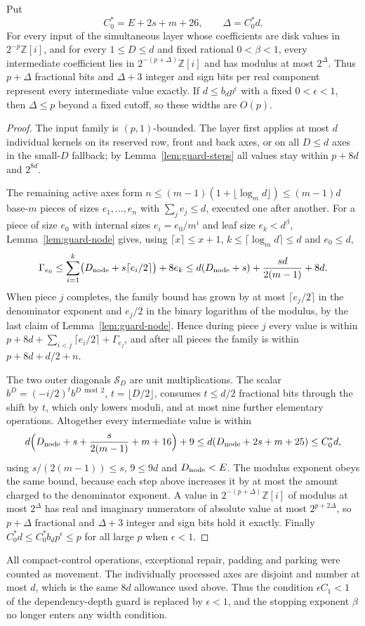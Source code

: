 \begin{proposition}\label{prop:linear-guard}
Put
\[
 C_0^*=E+2s+m+26,\qquad \Delta=C_0^*d .
\]
For every input of the simultaneous layer whose coefficients are disk values
in $2^{-p}\mathbb Z[i]$, and for every $1\le D\le d$ and fixed rational
$0<\beta<1$, every intermediate coefficient lies in
$2^{-(p+\Delta)}\mathbb Z[i]$ and has modulus at most $2^\Delta$. Thus $p+\Delta$
fractional bits and $\Delta+3$ integer and sign bits per real component
represent every intermediate value exactly. If $d\le b_dp^\epsilon$ with a
fixed $0<\epsilon<1$, then $\Delta\le p$ beyond a fixed cutoff, so these
widths are $O(p)$.
\end{proposition}
\begin{proof}
The input family is $(p,1)$-bounded. The layer first applies at most $d$
individual kernels on its reserved row, front and back axes, or on all $D\le d$
axes in the small-$D$ fallback; by Lemma~\ref{lem:guard-steps} all values stay
within $p+8d$ and $2^{8d}$.

The remaining active axes form $n\le(m-1)(1+\lfloor\log_md\rfloor)\le(m-1)d$
base-$m$ pieces of sizes $e_1,\ldots,e_n$ with $\sum_je_j\le d$, executed one
after another. For a piece of size $e_0$ with internal sizes
$e_i=e_0/m^i$ and leaf size $e_k<d^\beta$, Lemma~\ref{lem:guard-node} gives,
using $\lceil x\rceil\le x+1$, $k\le\lceil\log_md\rceil\le d$ and $e_0\le d$,
\[
 \Gamma_{e_0}\le\sum_{i=1}^k\bigl(D_{\rm node}+s\lceil e_i/2\rceil\bigr)+8e_k
 \le d(D_{\rm node}+s)+\frac{sd}{2(m-1)}+8d .
\]
When piece $j$ completes, the family bound has grown by at most
$\lceil e_j/2\rceil$ in the denominator exponent and $e_j/2$ in the binary
logarithm of the modulus, by the last claim of Lemma~\ref{lem:guard-node}. Hence during piece $j$ every value is within
$p+8d+\sum_{i<j}\lceil e_i/2\rceil+\Gamma_{e_j}$, and after all pieces the
family is within $p+8d+d/2+n$.

The two outer diagonals $\mathcal S_D$ are unit multiplications. The scalar
$b^D=(-i/2)^tb^{D\bmod2}$, $t=\lfloor D/2\rfloor$, consumes $t\le d/2$
fractional bits through the shift by $t$, which only lowers moduli, and at most
nine further elementary operations. Altogether every intermediate value is
within
\[
 d\Bigl(D_{\rm node}+s+\frac{s}{2(m-1)}+m+16\Bigr)+9
 \le d(D_{\rm node}+2s+m+25)\le C_0^*d,
\]
using $s/(2(m-1))\le s$, $9\le9d$ and $D_{\rm node}<E$. The modulus exponent
obeys the same bound, because each step above increases it by at most the
amount charged to the denominator exponent. A value in
$2^{-(p+\Delta)}\mathbb Z[i]$ of modulus at most $2^\Delta$ has real and
imaginary numerators of absolute value at most $2^{p+2\Delta}$, so $p+\Delta$
fractional and $\Delta+3$ integer and sign bits hold it exactly. Finally
$C_0^*d\le C_0^*b_dp^\epsilon\le p$ for all large $p$ when $\epsilon<1$.
\end{proof}

All compact-control operations, exceptional repair, padding and parking were
counted as movement. The individually processed axes are disjoint and number
at most $d$, which is the same $8d$ allowance used above. Thus the condition
$\epsilon C_1<1$ of the dependency-depth guard is replaced by $\epsilon<1$,
and the stopping exponent $\beta$ no longer enters any width condition.
